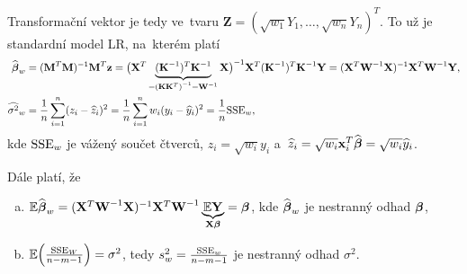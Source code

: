 Transformační vektor je tedy ve~tvaru $\textbf{Z} = (\sqrt{w_1}Y_1,\dots,\sqrt{w_n}Y_n)^T$. To už je standardní model LR, na~kterém platí
\begin{align*}
\widehat{\boldsymbol{\beta}}_w & = {(\textbf{M}^T\textbf{M})^{-1}}\textbf{M}^T\textbf{z} = {\big(\mathbf{X}^T\underbrace{(\textbf{K}^{-1})^T {\textbf{K}^{-1}}}_{ = {{(\textbf{K}\textbf{K}^T)}^{-1}} = {\textbf{W}^{-1}}}\mathbf{X}\big)^{-1}}\mathbf{X}^T({\textbf{K}^{-1}})^T{\textbf{K}^{-1}}\mathbf{Y} = {(\mathbf{X}^T{\textbf{W}^{-1}}\mathbf{X})^{-1}}\mathbf{X}^T{\textbf{W}^{-1}}\mathbf{Y}, \\
\widehat{{\sigma}^2}_w & = \frac{1}{n}\sum\limits_{i=1}^{n} (z_i-\widehat{z}_i)^2 = \frac{1}{n}\sum\limits_{i=1}^{n} w_i(y_i-\widehat{y}_i)^2 = \frac{1}{n}\mathrm{SSE}_w,
\end{align*}
 kde $\mathrm{SSE}_w$ je vážený součet čtverců, $z_i = \sqrt{w_i}y_i$ a~$\widehat{z}_i = \sqrt{w_i}\mathbf{x}_i^T\widehat{\boldsymbol{\beta}} = \sqrt{w_i}\widehat{y}_i$.
 
Dále platí, že
\begin{enumerate}[a)]
	\item $\mathbb{E}\widehat{\boldsymbol{\beta}}_w = {(\mathbf{X}^T{\textbf{W}^{-1}}\mathbf{X})^{-1}}\mathbf{X}^T{\textbf{W}^{-1}}\underbrace{\mathbb{E} \mathbf{Y}}_{\mathbf{X}\boldsymbol{\beta}} = \boldsymbol{\beta}$, kde $\widehat{\boldsymbol{\beta}}_w$ je nestranný odhad $\boldsymbol{\beta}$,
	\item $\mathbb{E}\Big(\frac{\mathrm{SSE}_W}{n-m-1}\Big) = \sigma^2$, tedy $s_w^2 = \frac{\mathrm{SSE}_w}{n-m-1}$ je nestranný odhad $\sigma^2$.
\end{enumerate}

